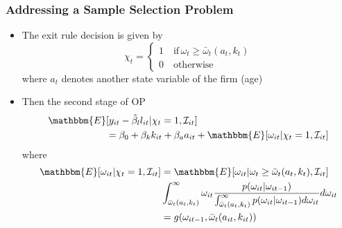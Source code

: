 \documentclass{beamer}
\begin{document}
\begin{frame}
\frametitle{Addressing a Sample Selection Problem}
\begin{itemize}
	\item The exit rule decision is given by
	\begin{equation}
		\chi_{t}=
		\begin{cases}
		1 \quad \text{if}\, \omega_{t}\geq\bar{\omega}_{t}(a_{t}, k_{t})\\
		0 \quad \text{otherwise}
		\end{cases}
	\end{equation}
	where $a_{t}$ denotes another state variable of the firm (age)
	\item Then the second stage of OP
	\begin{equation}
	\begin{split}
	\mathbbm{E}&[y_{it}-\hat{\beta}_{l}l_{it}|\chi_{t}=1, \mathcal{I}_{it}]\\
	&=\beta_{0}+\beta_{k}k_{it}+\beta_{a}a_{it}+\mathbbm{E}[\omega_{it}|\chi_{t}=1, \mathcal{I}_{it}]
	\end{split}
	\end{equation}
	where
	\begin{equation}
	\begin{split}
	\mathbbm{E}[\omega_{it}|\chi_{t}=1, \mathcal{I}_{it}]&=\mathbbm{E}[\omega_{it}|\omega_{t}\geq\bar{\omega}_{t}(a_{t}, k_{t}), \mathcal{I}_{it}]\\
	&\int_{\bar{\omega}_{t}(a_{t}, k_{t})}^{\infty}\omega_{it}\frac{p(\omega_{it}|\omega_{it-1})}{\int_{\bar{\omega}_{t}(a_{t}, k_{t})}^{\infty}p(\omega_{it}|\omega_{it-1})d\omega_{it}}d\omega_{it}\\
	&=g(\omega_{it-1}, \bar{\omega}_{t}(a_{it}, k_{it}))
	\end{split}
	\end{equation}
\end{itemize}
\end{frame}
\end{document}
